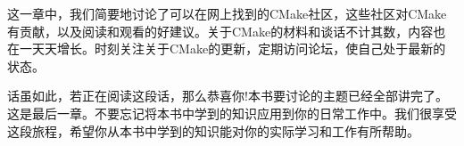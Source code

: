 这一章中，我们简要地讨论了可以在网上找到的CMake社区，这些社区对CMake有贡献，以及阅读和观看的好建议。关于CMake的材料和谈话不计其数，内容也在一天天增长。时刻关注关于CMake的更新，定期访问论坛，使自己处于最新的状态。

话虽如此，若正在阅读这段话，那么恭喜你!本书要讨论的主题已经全部讲完了。这是最后一章。不要忘记将本书中学到的知识应用到你的日常工作中。我们很享受这段旅程，希望你从本书中学到的知识能对你的实际学习和工作有所帮助。
